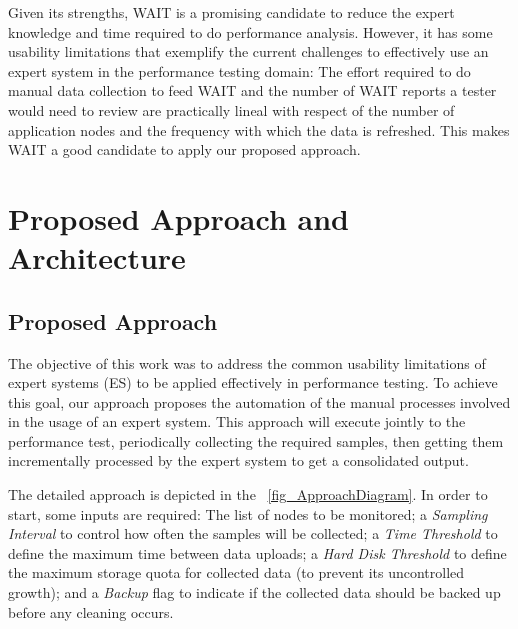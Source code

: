 \documentclass[runningheads,a4paper]{llncs}
\begin{document}
Given its strengths, WAIT is a promising candidate to reduce the expert
knowledge and time required to do performance analysis. However, it has
some usability limitations that exemplify the current challenges to effectively
use an expert system in the performance testing domain: The effort required to
do manual data collection to feed WAIT and the number of WAIT reports a tester
would need to review are practically lineal with respect of the number of
application nodes and the frequency with which the data is
refreshed. This makes WAIT a good candidate to apply our proposed approach.

\vspace{-5pt}
\section{Proposed Approach and Architecture}
\label{ProposedApproach}
\vspace{-5pt}


\subsection{Proposed Approach}
\vspace{-5pt}
The objective of this work was to address the common usability limitations of
expert systems (ES) to be applied effectively in performance testing. To achieve
this goal, our approach proposes the automation of the manual processes involved
in the usage of an expert system. This approach will execute jointly to the
performance test, periodically collecting the required samples, then getting
them incrementally processed by the expert system to get a consolidated output.

The detailed approach is depicted in the \figurename
~\ref{fig_ApproachDiagram}. In order to start, some inputs are
required: The list of nodes to be monitored; a \emph{Sampling Interval} to
control how often the samples will be collected; a \emph{Time Threshold} to
define the maximum time between data uploads; a \emph{Hard Disk Threshold} to
define the maximum storage quota for collected data (to prevent its uncontrolled
growth); and a \emph{Backup} flag to indicate if the collected data should be
backed up before any cleaning occurs.
\end{document}
